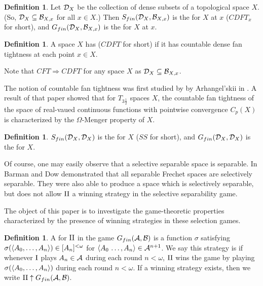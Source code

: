 \documentclass{amsart}
\theoremstyle{plain}
\theoremstyle{definition}
\newtheorem{definition}[theorem]{Definition}
\theoremstyle{remark}
\theoremstyle{plain}
\theoremstyle{definition}
\theoremstyle{remark}
\begin{document}
\begin{definition}
  Let \(\mathcal{D}_{X}\) be the collection of dense subsets of a topological
  space \(X\). (So, \(\mathcal{D}_X\subseteq \mathcal{B}_{X,x}\) for all \(x\in X\).)
  Then \(S_{fin}(\mathcal{D}_X,\mathcal{B}_{X,x})\) is the
   for \(X\) at \(x\)
  (\(CDFT_x\) for short), and
  \(G_{fin}(\mathcal{D}_X,\mathcal{B}_{X,x})\) is the
   for \(X\) at \(x\).
\end{definition}

\begin{definition}
  A space \(X\) has 
  (\(CDFT\) for short) if it has
  countable dense fan tightness at each point \(x\in X\).
\end{definition}

Note that \(CFT\Rightarrow CDFT\) for any space \(X\) as
\(\mathcal{D}_X\subseteq \mathcal{B}_{X,x}\).

The notion of countable fan tightness was first studied by
by Arhangel'skii in \cite{MR837289}. A result of that paper showed
that for \(T_{3\frac{1}{2}}\) spaces \(X\), the countable fan tightness
of the space of real-vaued continuous functions with
pointwise convergence \(C_p(X)\) is characterized by
the \(\Omega\)-Menger property of \(X\).


\begin{definition}
  \(S_{fin}(\mathcal{D}_X,\mathcal{D}_X)\) is the
   for \(X\)
  (\(SS\) for short), and
  \(G_{fin}(\mathcal{D}_X,\mathcal{D}_X)\) is the
   for \(X\).
\end{definition}

Of course, one may easily observe that a selective separable space is
separable. In \cite{MR2678950} Barman and Dow demonstrated that all
separable Frechet spaces are selectively separable. They were also able
to produce a space which is selectively separable, but does not allow
\(\mathrm{II}\) a winning strategy in the selective separability game.

The object of this paper is to investigate the game-theoretic properties
characterized by the presence of winning 
strategies in these selection games.

\begin{definition}
  A  for \(\mathrm{II}\) in the game \(G_{fin}(\mathcal{A},\mathcal{B})\)
  is a function \(\sigma\) satisfying
  \(\sigma(\langle A_0,\dots,A_n\rangle)\in[A_n]^{<\omega}\) for
  \(\langle A_0\,\dots,A_n\rangle\in\mathcal{A}^{n+1}\). We say this strategy is
   if whenever \(\mathrm{I}\) plays \(A_n\in\mathcal{A}\) during each
  round \(n<\omega\), \(\mathrm{II}\) wins the game by playing
  \(\sigma(\langle A_0,\dots,A_n\rangle)\) during each round \(n<\omega\).
  If a winning strategy exists, then we write
  \(\mathrm{II}\uparrow G_{fin}(\mathcal{A},\mathcal{B})\).
\end{definition}
\end{document}
